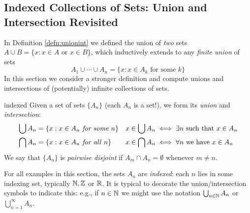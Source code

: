 \clearpage



\subsection{Indexed Collections of Sets: Union and Intersection Revisited}\label{sec:indexed}

In Definition \ref{defn:unionint} we defined the union of \emph{two} sets $A\cup B=\{x:x\in A\text{ or }x\in B\}$, which inductively extends to any \emph{finite union} of sets
\[
	A_1\cup\cdots\cup A_n=\{x:x\in A_k\text{ for some }k\}
\]
In this section we consider a stronger definition and compute unions and intersections of (potentially) infinite collections of sets.

\begin{defn}{}{indexed}
	Given a set of sets $\{A_n\}$ (each $A_n$ is a set!), we form its \emph{union} and \emph{intersection}:
	\begin{align*}
		&\bigcup A_n=\{x:x\in A_n\text{\emph{ for some} }n\} &&x\in\bigcup A_n\iff \exists n\text{ such that }x\in A_n\\
		&\bigcap A_n=\{x:x\in A_n\text{\emph{ for all} }n\} &&x\in\bigcap A_n\iff \forall n\text{ we have }x\in A_n
	\end{align*}
	We say that $\{A_n\}$ is \emph{pairwise disjoint} if $A_m\cap A_n=\emptyset$ whenever $m\neq n$.
\end{defn}

For all examples in this section, the sets $A_n$ are \emph{indexed}: each $n$ lies in some indexing set, typically $\mathbb{N},\mathbb{Z}$ or $\mathbb{R}$. It is typical to decorate the union/intersection symbols to indicate this: e.g., if $n\in\mathbb{N}$ we might use the notation $\bigcup_{n\in\mathbb{N}} A_n$ or $\bigcup_{n=1}^{\infty} A_n$.



